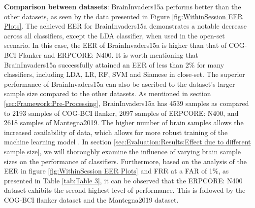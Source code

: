 \textbf{\large Comparison between datasets}: BrainInvaders15a performs better than the other datasets, as seen by the data presented in Figure \ref{fig:WithinSession EER Plots}. The achieved EER for BrainInvaders15a demonstrates a notable decrease across all classifiers, except the LDA classifier, when used in the open-set scenario. In this case, the EER of BrainInvaders15a is higher than that of COG-BCI Flanker and ERPCORE: N400. It is worth mentioning that BrainInvaders15a successfully attained an EER of less than 2$\%$ for many classifiers, including LDA, LR, RF, SVM and Siamese in close-set. The superior performance of BrainInvaders15a can also be ascribed to the dataset's larger sample size compared to the other datasets. As mentioned in section \ref{sec:Framework:Pre-Processing}, BrainInvaders15a has 4539 samples as compared to 2193 samples of COG-BCI flanker, 2097 samples of ERPCORE: N400, and 2618 samples of Mantegna2019. The higher number of brain samples allows the increased availability of data, which allows for more robust training of the machine learning model \cite{arias2023performance}. In section \ref{sec:Evaluation:Results:Effect due to different sample size}, we will thoroughly examine the influence of varying brain sample sizes on the performance of classifiers. Furthermore, based on the analysis of the EER in figure \ref{fig:WithinSession EER Plots} and FRR at a FAR of 1$\%$, as presented in Table \ref{tab:Table 3}, it can be observed that the ERPCORE: N400 dataset exhibits the second highest level of performance. This is followed by the COG-BCI flanker dataset and the Mantegna2019 dataset. 
\smallskip

